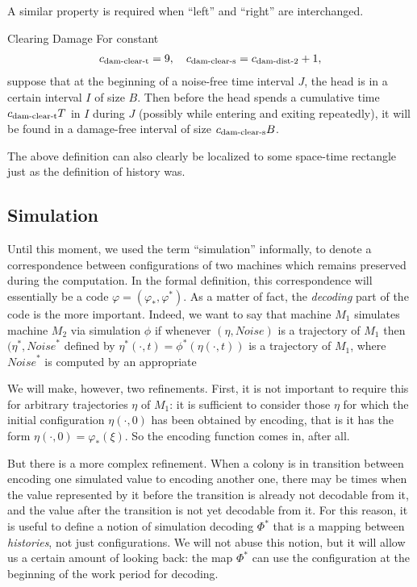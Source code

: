 \documentclass[12pt]{memoir}
\def\B{B}
\newcommand{\Noise}{\mathit{Noise}}
\newcommand{\Tu}{T}
\newcommand{\cns}[1]{c_{\textrm{\upshape #1}}}
\newcommand{\cDamClearS}{\cns{dam-clear-s}}
\newcommand{\cDamClearT}{\cns{dam-clear-t}}
\newcommand{\cDamDist}[1]{\cns{dam-dist-#1}}
\begin{document}
\begin{definition}[Trajectory]
\begin{flushdescription}
A similar property is required when ``left'' and ``right'' are interchanged.

\item[Clearing Damage] \label{i:def.traj.damage-within}
For constant
\begin{align}\label{eq:cns.dam-clear}
        \cDamClearT =9,
\quad   \cDamClearS =\cDamDist2 +1,
 \end{align}
suppose that at the beginning of a noise-free time interval \( J \), 
the head is in a certain interval \( I \) of size \( \B \).
Then before the head spends a cumulative time 
 \( \cDamClearT \Tu \)  in \( I \) during \( J \) (possibly while
entering and exiting repeatedly), it will be found
in a damage-free interval of size \( \cDamClearS \B  \).

\end{flushdescription}

The above definition can also clearly be localized to some space-time
rectangle just as the definition of history was.
\end{definition}


\subsection{Simulation}

Until this moment, we used the term ``simulation'' informally, to denote
a correspondence between configurations of
two machines which remains preserved during the computation.
In the formal definition, this correspondence will essentially be a code
\( \varphi=(\varphi_{*},\varphi^{*}) \).
As a matter of fact, the \emph{decoding} part of the code is the more important.
Indeed, we want to say that machine \( M_{1} \) simulates machine \( M_{2} \) via
simulation \( \phi \) if whenever \( (\eta, \Noise) \) is a trajectory of \( M_{1} \) 
then \( (\eta^{*},\Noise^{*} \) 
defined by \( \eta^{*}(\cdot,t)=\phi^{*}(\eta(\cdot,t)) \) is a
trajectory of \( M_{1} \), where \( \Noise^{*} \) is computed by an appropriate



We will make, however, two refinements.
First, it is not important to require this for arbitrary trajectories \( \eta \) of \( M_{1} \):
it is sufficient to consider those \( \eta \) for which the initial configuration
 \( \eta(\cdot,0) \) has been obtained by encoding, that is it has the form 
\( \eta(\cdot,0)=\varphi_{*}(\xi) \).
So the encoding function comes in, after all.

But there is a more complex refinement.
When a colony is in transition between encoding one simulated value to encoding another one,
there may be times when the value represented by it before the transition
is already not decodable from it, and the value after the transition is not yet decodable from it.
For this reason, it is useful to define a notion of simulation decoding \( \Phi^{*} \)
that is a mapping between \emph{histories}, not just configurations.
We will not abuse this notion, but it will allow us a certain amount of looking back:
the map \( \Phi^{*} \) can use the configuration at the beginning of the work period for decoding.
\end{document}
